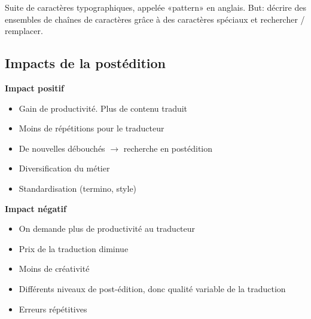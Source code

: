 Suite de caractères typographiques, appelée «pattern» en anglais. But: décrire des ensembles de chaînes de caractères grâce à des caractères spéciaux et rechercher / remplacer.

\subsection{Impacts de la postédition}

\textbf{Impact positif}

\begin{itemize}
    \item Gain de productivité. Plus de contenu traduit
    \item Moins de répétitions pour le traducteur
    \item De nouvelles débouchés $\rightarrow$ recherche en postédition
    \item Diversification du métier
    \item Standardisation (termino, style)\\
\end{itemize}

\textbf{Impact négatif}

\begin{itemize}
    \item On demande plus de productivité au traducteur
    \item Prix de la traduction diminue
    \item Moins de créativité
    \item Différents niveaux de post-édition, donc qualité variable de la traduction
    \item Erreurs répétitives
\end{itemize}
